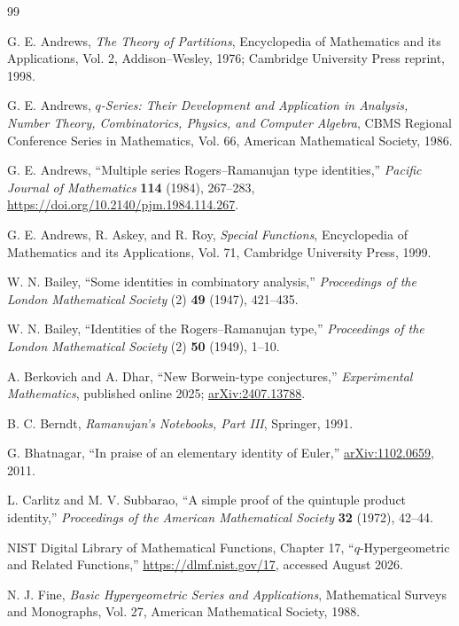 \documentclass[11pt,oneside]{article}
\theoremstyle{definition}
\begin{document}
\begin{thebibliography}{99}

G. E. Andrews,
\emph{The Theory of Partitions},
Encyclopedia of Mathematics and its Applications, Vol. 2,
Addison--Wesley, 1976; Cambridge University Press reprint, 1998.

G. E. Andrews,
\emph{$q$-Series: Their Development and Application in Analysis, Number
Theory, Combinatorics, Physics, and Computer Algebra},
CBMS Regional Conference Series in Mathematics, Vol. 66,
American Mathematical Society, 1986.

G. E. Andrews,
``Multiple series Rogers--Ramanujan type identities,''
\emph{Pacific Journal of Mathematics} \textbf{114} (1984), 267--283,
\url{https://doi.org/10.2140/pjm.1984.114.267}.

G. E. Andrews, R. Askey, and R. Roy,
\emph{Special Functions},
Encyclopedia of Mathematics and its Applications, Vol. 71,
Cambridge University Press, 1999.

W. N. Bailey,
``Some identities in combinatory analysis,''
\emph{Proceedings of the London Mathematical Society} (2)
\textbf{49} (1947), 421--435.

W. N. Bailey,
``Identities of the Rogers--Ramanujan type,''
\emph{Proceedings of the London Mathematical Society} (2)
\textbf{50} (1949), 1--10.

A. Berkovich and A. Dhar,
``New Borwein-type conjectures,''
\emph{Experimental Mathematics}, published online 2025;
\href{https://arxiv.org/abs/2407.13788}{arXiv:2407.13788}.

B. C. Berndt,
\emph{Ramanujan's Notebooks, Part III},
Springer, 1991.

G. Bhatnagar,
``In praise of an elementary identity of Euler,''
\href{https://arxiv.org/abs/1102.0659}{arXiv:1102.0659}, 2011.

L. Carlitz and M. V. Subbarao,
``A simple proof of the quintuple product identity,''
\emph{Proceedings of the American Mathematical Society}
\textbf{32} (1972), 42--44.

NIST Digital Library of Mathematical Functions,
Chapter 17, ``$q$-Hypergeometric and Related Functions,''
\url{https://dlmf.nist.gov/17}, accessed August 2026.

N. J. Fine,
\emph{Basic Hypergeometric Series and Applications},
Mathematical Surveys and Monographs, Vol. 27,
American Mathematical Society, 1988.


\end{thebibliography}
\end{document}
